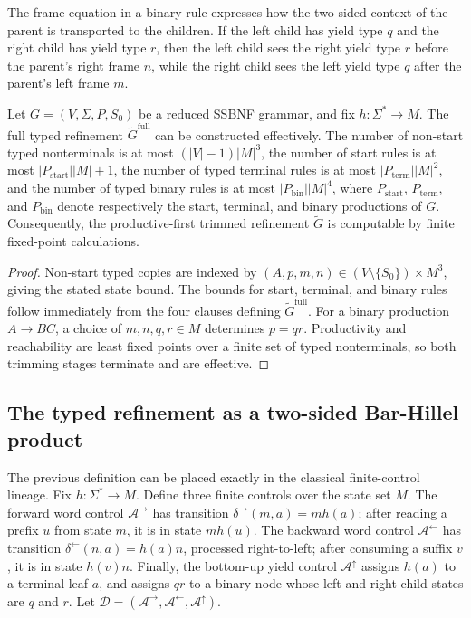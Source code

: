 \documentclass[sub]{jalc}
\newcommand{\Gfull}{\widetilde G^{\mathrm{full}}}
\newcommand{\Gtrim}{\widetilde G}
\begin{document}
The frame equation in a binary rule expresses how the two-sided context of the parent is transported to the children. If the left child has yield type \(q\) and the right child has yield type \(r\), then the left child sees the right yield type \(r\) before the parent's right frame \(n\), while the right child sees the left yield type \(q\) after the parent's left frame \(m\).

\begin{proposition}
\label{prop:effective-size}
Let \(G=(V,\Sigma,P,S_0)\) be a reduced SSBNF grammar, and fix \(h:\Sigma^*\to M\). The full typed refinement \(\Gfull\) can be constructed effectively. The number of non-start typed nonterminals is at most \((|V|-1)|M|^3\), the number of start rules is at most \(|P_{\mathrm{start}}||M|+1\), the number of typed terminal rules is at most \(|P_{\mathrm{term}}||M|^2\), and the number of typed binary rules is at most \(|P_{\mathrm{bin}}||M|^4\), where \(P_{\mathrm{start}}\), \(P_{\mathrm{term}}\), and \(P_{\mathrm{bin}}\) denote respectively the start, terminal, and binary productions of \(G\). Consequently, the productive-first trimmed refinement \(\Gtrim\) is computable by finite fixed-point calculations.
\end{proposition}

\begin{proof}
Non-start typed copies are indexed by \((A,p,m,n)\in (V\setminus\{S_0\})\times M^3\), giving the stated state bound. The bounds for start, terminal, and binary rules follow immediately from the four clauses defining \(\Gfull\). For a binary production \(A\to BC\), a choice of \(m,n,q,r\in M\) determines \(p=qr\). Productivity and reachability are least fixed points over a finite set of typed nonterminals, so both trimming stages terminate and are effective.
\end{proof}


\subsection{The typed refinement as a two-sided Bar-Hillel product}
\label{subsec:barhillel-product}

The previous definition can be placed exactly in the classical finite-control
lineage.  Fix \(h:\Sigma^*\to M\).  Define three finite controls over the state
set \(M\).  The forward word control \(\mathcal A^{\rightarrow}\) has transition
\(\delta^{\rightarrow}(m,a)=m h(a)\); after reading a prefix \(u\) from state
\(m\), it is in state \(m h(u)\).  The backward word control
\(\mathcal A^{\leftarrow}\) has transition
\(\delta^{\leftarrow}(n,a)=h(a)n\), processed right-to-left; after consuming a
suffix \(v\), it is in state \(h(v)n\).  Finally, the bottom-up yield control
\(\mathcal A^{\uparrow}\) assigns \(h(a)\) to a terminal leaf \(a\), and assigns
\(qr\) to a binary node whose left and right child states are \(q\) and \(r\).
Let \(\mathcal D=(\mathcal A^{\rightarrow},\mathcal A^{\leftarrow},
\mathcal A^{\uparrow})\).
\end{document}
